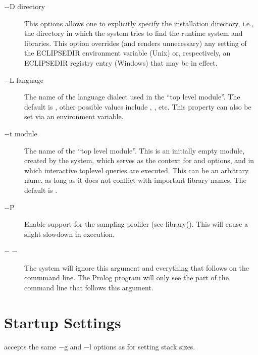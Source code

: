 \begin{description}
\item[$-$D directory]
This options allows one to explicitly specify the {\eclipse} installation
directory, i.e., the directory in which the system tries to find
the {\eclipse} runtime system and libraries.  This option overrides
(and renders unnecessary) any setting of the ECLIPSEDIR environment
variable (Unix) or, respectively, an ECLIPSEDIR registry entry
(Windows) that may be in effect.

\item[$-$L language]
The name of the language dialect used in the ``top level module''.
The default is , other possible values
include , ,  etc.
This property can also be set via an 
environment variable.

\item[$-$t module]
The name of the ``top level module''.  This is an initially empty module,
created by the system, which serves as the context for  and
 options, and in which interactive toplevel queries are executed.
This can be an arbitrary name, as long as it does not conflict with
important library names.  The default is .

\item[$-$P]
Enable support for the sampling profiler (see
library().
This will cause a slight slowdown in execution.

\item[$-$ $-$]\cmdlineoptionidx{-}
The {\eclipse} system will ignore this argument and everything that follows on
the commmand line. The Prolog program will only see the part of the
command line that follows this argument.
\end{description}


\section{{\tkeclipse} Startup Settings}

 accepts the same $-$g and $-$l options as
 for setting stack sizes.

